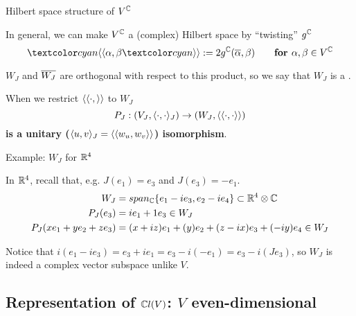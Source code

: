 \begin{frame}{Hilbert space structure of $V^\mathbb C$} %
    
    In general, we can make $V^\mathbb C$ a (complex) Hilbert space by ``twisting'' $g^\mathbb C$ \[ \defn{\bbra} \alpha, \beta \defn{\kket} := 2 g^\CC(\conj{\alpha}, \beta) \qquad \textbf{for } \alpha, \beta \in V^\CC \]
    
    $W_J$ and $\overline{W_J}$ are orthogonal with respect to this product, so we say that $W_J$ is a .
    
    When we restrict $\langle\langle \cdot , \rangle\rangle$ to $W_J$ \[P_J: (V_J, \langle \cdot, \cdot \rangle_J) \to (W_J, \langle\langle \cdot, \cdot \rangle\rangle) \] \textbf{is a unitary ($\langle u, v \rangle_J = \langle\langle w_u, w_v \rangle\rangle$) isomorphism}.
    
\end{frame}

\begin{frame}{Example: $W_J$ for $\mathbb R^4$} %

    In $\mathbb R^4$, recall that, e.g. $J(e_1) = e_3$ and $J(e_3) = -e_1$.
    \begin{align*}
        W_J &= span_\mathbb C\{e_1 -i e_3, e_2 - ie_4\} \subset{\mathbb R^4 \otimes \mathbb C} \\
        P_J(e_3) &= ie_1 + 1e_3 \in W_J \\
        P_J(x e_1 + y e_2 + z e_3) &= (x + iz)e_1 + (y)e_2 + (z - ix)e_3 + (-iy)e_4\in W_J
    \end{align*}
    


Notice that $i(e_1 - i e_3) = e_3 + ie_1 = e_3 - i (-e_1) = e_3 - i (J e_3)$, so $W_J$ is indeed a complex vector subspace unlike $V$.

\end{frame}

\subsection{Representation of $\mathbb C l(V)$: $V$ even-dimensional}

